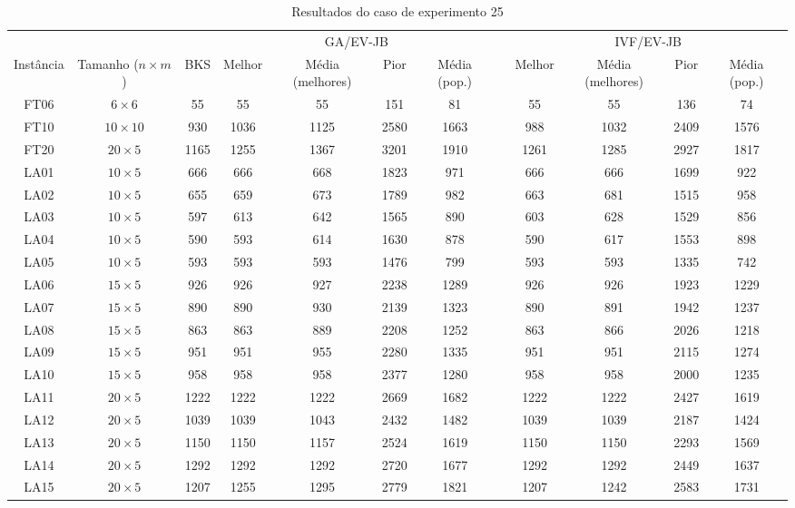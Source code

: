 \begin{sidewaystable}
\caption{Resultados do caso de experimento 25}
\centering
\label{experimento25}
\begin{tabular}{cccccccccccc}
\toprule
& & & \multicolumn{4}{c}{GA/EV-JB} & & \multicolumn{4}{c}{IVF/EV-JB} \\
\cmidrule(c){4-7}
\cmidrule(c){9-12}
Inst\^{a}ncia & Tamanho ($n \times m$) & BKS & Melhor & M\'{e}dia (melhores) & Pior & M\'{e}dia (pop.) & & Melhor & M\'{e}dia (melhores) & Pior & M\'{e}dia (pop.) \\
\midrule
FT06 & $6 \times 6$ & 55 & 55 & 55 & 151 & 81 & & 55 & 55 & 136 & 74 \\
FT10 & $10 \times 10$ & 930 & 1036 & 1125 & 2580 & 1663 & & 988 & 1032 & 2409 & 1576 \\
FT20 & $20 \times 5$ & 1165 & 1255 & 1367 & 3201 & 1910 & & 1261 & 1285 & 2927 & 1817 \\
LA01 & $10 \times 5$ & 666 & 666 & 668 & 1823 & 971 & & 666 & 666 & 1699 & 922 \\
LA02 & $10 \times 5$ & 655 & 659 & 673 & 1789 & 982 & & 663 & 681 & 1515 & 958 \\
LA03 & $10 \times 5$ & 597 & 613 & 642 & 1565 & 890 & & 603 & 628 & 1529 & 856 \\
LA04 & $10 \times 5$ & 590 & 593 & 614 & 1630 & 878 & & 590 & 617 & 1553 & 898 \\
LA05 & $10 \times 5$ & 593 & 593 & 593 & 1476 & 799 & & 593 & 593 & 1335 & 742 \\
LA06 & $15 \times 5$ & 926 & 926 & 927 & 2238 & 1289 & & 926 & 926 & 1923 & 1229 \\
LA07 & $15 \times 5$ & 890 & 890 & 930 & 2139 & 1323 & & 890 & 891 & 1942 & 1237 \\
LA08 & $15 \times 5$ & 863 & 863 & 889 & 2208 & 1252 & & 863 & 866 & 2026 & 1218 \\
LA09 & $15 \times 5$ & 951 & 951 & 955 & 2280 & 1335 & & 951 & 951 & 2115 & 1274 \\
LA10 & $15 \times 5$ & 958 & 958 & 958 & 2377 & 1280 & & 958 & 958 & 2000 & 1235 \\
LA11 & $20 \times 5$ & 1222 & 1222 & 1222 & 2669 & 1682 & & 1222 & 1222 & 2427 & 1619 \\
LA12 & $20 \times 5$ & 1039 & 1039 & 1043 & 2432 & 1482 & & 1039 & 1039 & 2187 & 1424 \\
LA13 & $20 \times 5$ & 1150 & 1150 & 1157 & 2524 & 1619 & & 1150 & 1150 & 2293 & 1569 \\
LA14 & $20 \times 5$ & 1292 & 1292 & 1292 & 2720 & 1677 & & 1292 & 1292 & 2449 & 1637 \\
LA15 & $20 \times 5$ & 1207 & 1255 & 1295 & 2779 & 1821 & & 1207 & 1242 & 2583 & 1731 \\
\bottomrule
\end{tabular}
\end{sidewaystable}
